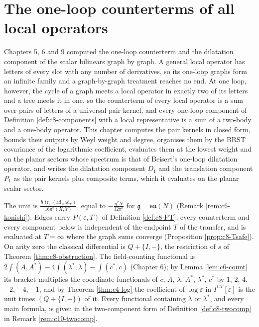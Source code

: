 \chapter{The one-loop counterterms of all local operators}

Chapters 5, 6 and 9 computed the one-loop counterterm and the dilatation component of the scalar bilinears graph by graph. A general local operator has letters of every slot with any number of derivatives, so its one-loop graphs form an infinite family and a graph-by-graph treatment reaches no end. At one loop, however, the cycle of a graph meets a local operator in exactly two of its letters and a tree meets it in one, so the counterterm of every local operator is a sum over pairs of letters of a universal pair kernel, and every one-loop component of Definition \ref{def:c8-components} with a local representative is a sum of a two-body and a one-body operator. This chapter computes the pair kernels in closed form, bounds their outputs by Weyl weight and degree, organises them by the BRST covariance of the logarithmic coefficient, evaluates them at the lowest weight and on the planar sectors whose spectrum is that of Beisert's one-loop dilatation operator, and writes the dilatation component $D_1$ and the translation component $P_1$ as the pair kernels plus composite terms, which it evaluates on the planar scalar sector.

The unit is $\frac{\hbar\operatorname{tr}_{\mathfrak g}(\mathrm{ad}_X\mathrm{ad}_Y)}{16\pi^2(X,Y)}$, equal to $-\frac{g^2N}{32\pi^2}$ for $\mathfrak g=\mathfrak{su}(N)$ (Remark \ref{rem:c6-konishi}). Edges carry $P(\varepsilon,T)$ of Definition \ref{def:c8-PT}; every counterterm and every component below is independent of the endpoint $T$ of the transfer, and is evaluated at $T=\infty$ where the graph sums converge (Proposition \ref{prop:c8-Tsafe}). On arity zero the classical differential is $Q+\{I,-\}$, the restriction of $s$ of Theorem \ref{thm:c8-obstruction}. The field-counting functional is $2\int(A,A^*)-4\int(\lambda^*,\lambda)-\int(c^*,c)$ (Chapter 6); by Lemma \ref{lem:c6-count} its bracket multiplies the coordinate functionals of $c$, $A$, $\lambda$, $A^*$, $\lambda^*$, $c^*$ by $1$, $2$, $4$, $-2$, $-4$, $-1$, and by Theorem \ref{thm:c4-log} the coefficient of $\log\varepsilon$ in $I^{CT}[\varepsilon]$ is the unit times $(Q+\{I,-\})$ of it. Every functional containing $\lambda$ or $\lambda^*$, and every main formula, is given in the two-component form of Definition \ref{def:c8-twocomp} in Remark \ref{rem:c10-twocomp}.

